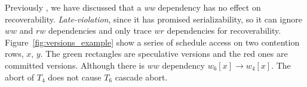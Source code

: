 \documentclass[conference]{IEEEtran}
\begin{document}
Previously , we have discussed that a \emph{ww} dependency has no effect on recoverability.
\emph{Late-violation}, since it has promised serializability, so it can ignore ${ww}$ and ${rw}$ dependencies and only trace ${wr}$ dependencies for recoverability.
Figure~\ref{fig:versions_example} show a series of schedule access on two contention rows, ${x}$, ${y}$.
The green rectangles are speculative versions and the red ones are committed versions.
Although there is ${ww}$ dependency ${w_6[x] \rightarrow w_4[x]}$.
The abort of $T_4$ does not cause ${T_6}$ cascade abort.
\begin{figure}[htbp]
  \centering
\end{figure}
\end{document}
